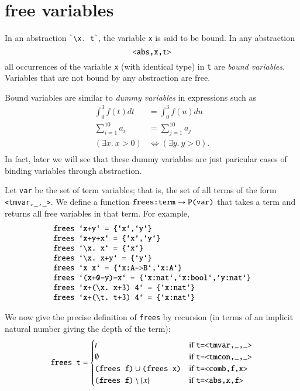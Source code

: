 \documentclass[cup9a]{cupbook}
\begin{document}
\section{free variables}

In an abstraction \verb!`\x. t`!, the variable \verb!x! is said to be
bound.  In any abstraction
$$
\verb!<abs,x,t>!
$$
all occurrences of the variable \verb!x! (with identical type) in \verb!t! are {\it bound variables}.  Variables that are not bound by any abstraction are free.

Bound variables are similar to {\it dummy variables} in expressions such as 
$$
\begin{array}{lll}
\int_0^3 f(t) dt &= \int_0^3 f(u) du\\
\sum_{i=1}^{10} a_i &= \sum_{j=1}^{10} a_j\\
(\exists x.~x>0)  &\Leftrightarrow (\exists y.~y>0).\\
\end{array}
$$
In fact, later we will see that these dummy variables are just paricular cases of binding variables through abstraction.

Let \verb!var! be the set of term variables; that is, the
set of all terms of the form \verb!<tmvar,_,_>!.
We define a function $\verb!frees:term!\to \verb!P(var)!$
that takes a term and returns all free variables in that term.  For example,
$$
\begin{array}{lll}
\verb!frees `x+y` = {`x`,`y`}!\\
\verb!frees `x+y+x` = {`x`,`y`}!\\
\verb!frees `\x. x` = {`x`}!\\
\verb!frees `\x. x+y` = {`y`}!\\
\verb!frees `x x` = {`x:A->B`,`x:A`}!\\
\verb!frees `(x+0=y)=x` = {`x:nat`,`x:bool`,`y:nat`}!\\
\verb!frees `x+(\x. x+3) 4` = {`x:nat`}!\\
\verb!frees `x+(\t. t+3) 4` = {`x:nat`}!\\
\end{array}
$$

We now give the precise definition of \verb!frees! by
recursion (in terms of an implicit natural number giving the depth of the term):
$$
\verb!frees t! =\begin{cases}
{t} & \hbox{if } \verb!t=<tmvar,_,_>!\\
\emptyset & \hbox{if } \verb!t=<tmcon,_,_>!\\
\verb!(frees f)! \cup \verb!(frees x)!&\hbox{if }\verb!t=<comb,f,x>!\\
\verb!(frees f)!\setminus \{x\}&\hbox{if }\verb!t=<abs,x,f>!
\end{cases}
$$
\end{document}
